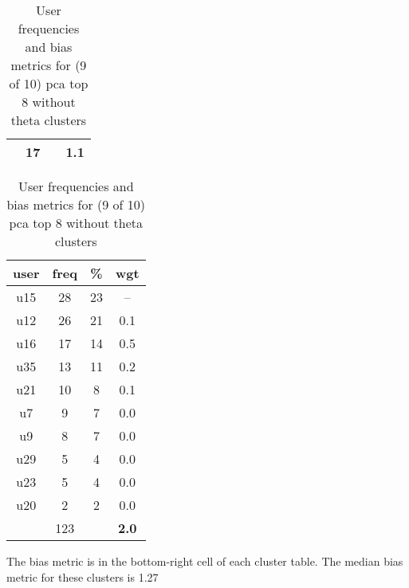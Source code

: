 \begin{table}
\begin{tabular}{ |c|c|c|c| }
	 & 17 & & \textbf{1.1} \\
	\hline
\end{tabular}
\begin{tabular}{ |c|c|c|c| }
	\hline
	\textbf{user} & \textbf{freq} & \textbf{\%} & \textbf{wgt} \\
	\hline
	u15 & 28 & 23 & -- \\
	u12 & 26 & 21 & 0.1 \\
	u16 & 17 & 14 & 0.5 \\
	u35 & 13 & 11 & 0.2 \\
	u21 & 10 & 8 & 0.1 \\
	u7 & 9 & 7 & 0.0 \\
	u9 & 8 & 7 & 0.0 \\
	u29 & 5 & 4 & 0.0 \\
	u23 & 5 & 4 & 0.0 \\
	u20 & 2 & 2 & 0.0 \\
	 & 123 & & \textbf{2.0} \\
	\hline
\end{tabular}
\caption{User frequencies and bias metrics for (9 of 10) pca top 8 without theta clusters}
{\small The bias metric is in the bottom-right cell of each cluster table. The median bias metric for these clusters is 1.27}
\end{table}

